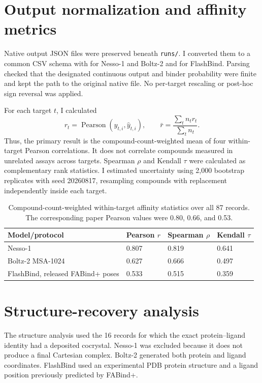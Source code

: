 \documentclass[11pt]{article}
\begin{document}
\section{Output normalization and affinity metrics}

Native output JSON files were preserved beneath \texttt{runs/}. I converted
them to a common CSV schema with
 for Nesso-1 and Boltz-2 and
 for FlashBind. Parsing checked
that the designated continuous output and binder probability were finite and
kept the path to the original native file. No per-target rescaling or
post-hoc sign reversal was applied.

For each target $t$, I calculated
\[
 r_t=\operatorname{Pearson}(y_{t,i},\hat y_{t,i}),
 \qquad
 \bar r=\frac{\sum_t n_t r_t}{\sum_t n_t}.
\]
Thus, the primary result is the compound-count-weighted mean of four
within-target Pearson correlations. It does not correlate compounds measured
in unrelated assays across targets. Spearman $\rho$ and Kendall $\tau$ were
calculated as complementary rank statistics. I estimated uncertainty using
2,000 bootstrap replicates with seed 20260817, resampling compounds with
replacement independently inside each target.

\begin{table}[H]
\centering
\small
\begin{tabular}{L{2.35in}C{1.05in}C{1.05in}C{1.05in}}
\toprule
Model/protocol & Pearson $r$ & Spearman $\rho$ & Kendall $\tau$ \\
\midrule
Nesso-1 & 0.807 & 0.819 & 0.641 \\
Boltz-2 MSA-1024 & 0.627 & 0.666 & 0.497 \\
FlashBind, released FABind+ poses & 0.533 & 0.515 & 0.359 \\
\bottomrule
\end{tabular}
\caption{Compound-count-weighted within-target affinity statistics over all
87 records. The corresponding paper Pearson values were 0.80, 0.66, and 0.53.}
\end{table}

\section{Structure-recovery analysis}

The structure analysis used the 16 records for which the exact
protein--ligand identity had a deposited cocrystal. Nesso-1 was excluded
because it does not produce a final Cartesian complex. Boltz-2 generated both
protein and ligand coordinates. FlashBind used an experimental PDB protein
structure and a ligand position previously predicted by FABind+.
\end{document}
